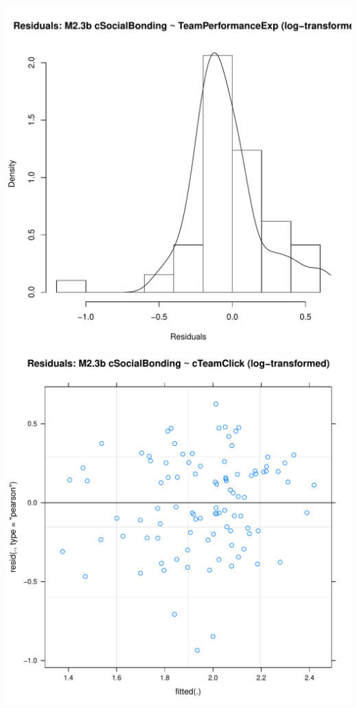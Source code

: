 \documentclass[12pt]{report}
\begin{document}
\newpage
\centering
\includegraphics[scale =.4]{../images/MLM23bLogHist.pdf}
\includegraphics[scale =.4]{../images/MLM23bLogScatter.pdf}
\end{document}
